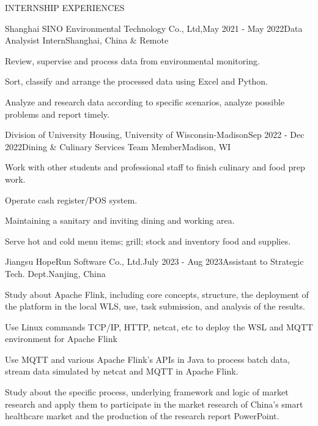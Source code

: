 \documentclass{resume} %
\begin{document}

\begin{rSection}{INTERNSHIP EXPERIENCES}

\begin{rSubsection}{Shanghai SINO Environmental Technology Co., Ltd,}{May 2021 - May 2022}{Data Analysist Intern}{Shanghai, China \& Remote}
\item Review, supervise and process data from environmental monitoring.
\item  Sort, classify and arrange the processed data using Excel and Python. 
\item  Analyze and research data according to specific scenarios, analyze possible problems and report timely.
\end{rSubsection}

\begin{rSubsection}{Division of University Housing, University of Wisconsin-Madison}{Sep 2022 - Dec 2022}{Dining \& Culinary Services Team Member}{Madison, WI}
\item  Work with other students and professional staff to finish culinary and food prep work. 
\item  Operate cash register/POS system. 
\item  Maintaining a sanitary and inviting dining and working area. 
\item  Serve hot and cold menu items; grill; stock and inventory food and supplies. 
\end{rSubsection}


\begin{rSubsection}{Jiangsu HopeRun Software Co., Ltd.}{July 2023 - Aug 2023}{Assistant to Strategic Tech. Dept.}{Nanjing, China}

\item Study about Apache Flink, including core concepts, structure, the deployment of the platform in the local WLS, use, task submission, and analysis of the results.


\item Use Linux commands  TCP/IP, HTTP, netcat, etc to deploy the WSL and MQTT environment for Apache Flink  
\item Use MQTT and various Apache Flink's APIs in Java to process batch data, stream data simulated by netcat and MQTT in Apache Flink.


\item Study about the specific process, underlying framework and logic of market research and apply them to participate in the market research of China's smart healthcare market and the production of the research report PowerPoint.


\end{rSubsection}
\end{rSection}
\end{document}

